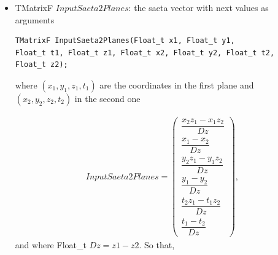 \documentclass[a4paper]{book}
\let\vec\mathbf  %
\begin{document}
\begin{itemize}
	\item TMatrixF $InputSaeta2Planes$: the saeta vector with next values as arguments
	
	\begin{lstlisting}
TMatrixF InputSaeta2Planes(Float_t x1, Float_t y1, 
Float_t t1, Float_t z1, Float_t x2, Float_t y2, Float_t t2, 
Float_t z2);
	\end{lstlisting}
	
	where $(x_1, y_1, z_1, t_1)$ are the coordinates in the first plane and $(x_2, y_2, z_2, t_2)$ in the second one
	
	
	\begin{align*}
	InputSaeta2Planes = \left(
	\begin{array}{c}
	 \dfrac{x_2 z_1-x_1 z_2}{Dz}\\
	 \dfrac{x_1-x_2}{Dz} \\
	 \dfrac{y_2 z_1-y_1 z_2}{Dz} \\
	 \dfrac{y_1-y_2}{Dz} \\
	 \dfrac{t_2 z_1-t_1 z_2}{Dz} \\
	 \dfrac{t_1-t_2}{Dz}
	\end{array} \right),
	\end{align*}
	and where Float\_t $Dz = z1 - z2$. So that,
	

\end{itemize}
\end{document}
